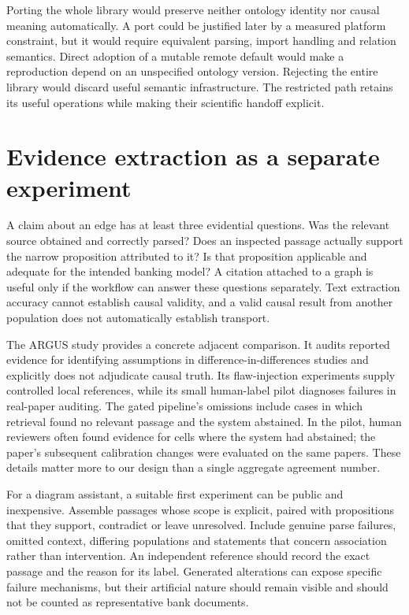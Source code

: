 Porting the whole library would preserve neither ontology identity nor
causal meaning automatically. A port could be justified later by a
measured platform constraint, but it would require equivalent parsing,
import handling and relation semantics. Direct adoption of a mutable
remote default would make a reproduction depend on an unspecified
ontology version. Rejecting the entire library would discard useful
semantic infrastructure. The restricted path retains its useful
operations while making their scientific handoff explicit.

\hypertarget{evidence-extraction-as-a-separate-experiment}{%
\section{Evidence extraction as a separate
experiment}\label{evidence-extraction-as-a-separate-experiment}}

A claim about an edge has at least three evidential questions. Was the
relevant source obtained and correctly parsed? Does an inspected passage
actually support the narrow proposition attributed to it? Is that
proposition applicable and adequate for the intended banking model? A
citation attached to a graph is useful only if the workflow can answer
these questions separately. Text extraction accuracy cannot establish
causal validity, and a valid causal result from another population does
not automatically establish transport.

The ARGUS study provides a concrete adjacent comparison. It audits
reported evidence for identifying assumptions in
difference-in-differences studies and explicitly does not adjudicate
causal truth. Its flaw-injection experiments supply controlled local
references, while its small human-label pilot diagnoses failures in
real-paper auditing. The gated pipeline's omissions include cases in
which retrieval found no relevant passage and the system abstained. In
the pilot, human reviewers often found evidence for cells where the
system had abstained; the paper's subsequent calibration changes were
evaluated on the same papers. These details matter more to our design
than a single aggregate agreement number. \citep{v12_la_2609_30867}

For a diagram assistant, a suitable first experiment can be public and
inexpensive. Assemble passages whose scope is explicit, paired with
propositions that they support, contradict or leave unresolved. Include
genuine parse failures, omitted context, differing populations and
statements that concern association rather than intervention. An
independent reference should record the exact passage and the reason for
its label. Generated alterations can expose specific failure mechanisms,
but their artificial nature should remain visible and should not be
counted as representative bank documents.

